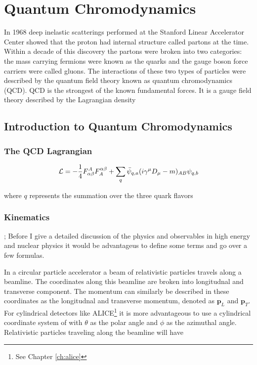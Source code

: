 
\chapter{Quantum Chromodynamics} \label{ch:qcd}
In 1968 deep inelastic scatterings performed at the Stanford Linear Accelerator Center showed that the proton had internal structure\cite{Riordan1287} called partons at the time.  Within a decade of this discovery the partons were broken into two categories: the mass carrying fermions were known as the quarks and the gauge boson force carriers were called gluons.  The interactions of these two types of particles were described by the quantum field theory known as quantum chromodynamics (QCD).  QCD is the strongest of the known fundamental forces.  It is a gauge field theory described by the Lagrangian density

\section{Introduction to Quantum Chromodynamics}

\subsection{The QCD Lagrangian}

\begin{equation}
{\cal L}=-\frac{1}{4}F^{A}_{\alpha\beta}F^{\alpha\beta}_{A}
+\sum_{q}
\bar{\psi}_{q,a}(i\gamma^{\mu}D_{\mu}-m)_{AB}
\psi_{q,b}
\label{eq:lagrangian}
\end{equation}

where $q$ represents the summation over the three quark flavors


\subsection{Kinematics}\label{sec:kinematics};
Before I give a detailed discussion of the physics and observables in high energy and nuclear physics it would be advantageus to define some terms and go over a few formulas.

In a circular particle accelerator a beam of relativistic particles travels along a beamline.  The coordinates along this beamline are broken into longitudnal and transverse component. The momentum can similarly be described in these coordinates as the longitudnal and transverse momentum, denoted as $\mathbf{p}_{L}$ and $\mathbf{p}_{T}$.  For cylindrical detectors like ALICE\footnote{See Chapter \ref{ch:alice}} it is more advantageous to use a cylindrical coordinate system of with $\theta$ as the polar angle and $\phi$ as the azimuthal angle.  Relativistic particles traveling along the beamline will have 

